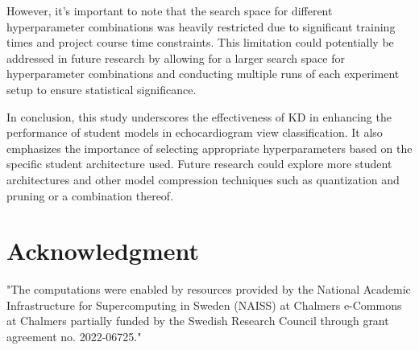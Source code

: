 \documentclass[11pt]{article}
\begin{document}
However, it's important to note that the search space for different hyperparameter combinations was heavily restricted due to significant training times and project course time constraints. This limitation could potentially be addressed in future research by allowing for a larger search space for hyperparameter combinations and conducting multiple runs of each experiment setup to ensure statistical significance.

In conclusion, this study underscores the effectiveness of KD in enhancing the performance of student models in echocardiogram view classification. It also emphasizes the importance of selecting appropriate hyperparameters based on the specific student architecture used. Future research could explore more student architectures and other model compression techniques such as quantization and pruning or a combination thereof.

\newpage
\section*{Acknowledgment}
"The computations were enabled by resources provided by the National Academic Infrastructure for Supercomputing in Sweden (NAISS) at Chalmers e-Commons at Chalmers partially funded by the Swedish Research Council through grant agreement no. 2022-06725."



\end{document}
